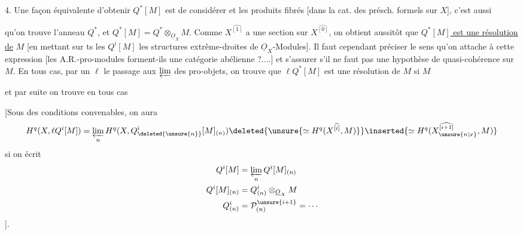 4. Une façon équivalente d'obtenir $Q^*[M]$ est de considérer
et les produits fibrés [dans la cat. des présch. formels sur $X$],  c'est aussi

qu'on trouve l'anneau  $Q^*$, et $Q^*[M]=Q^*\otimes_{\underline O_X}M$. Comme $X^{\widehat{[1]}}$ a une section sur $X^{\widehat{[0]}}$, on obtient aussitôt que \uline{$Q^*[M]$ est une résolution de} $M$ [en mettant sur ts les $Q^i[M]$ les structures extrême-droites de $\underline O_X$-Modules]. Il faut cependant préciser le sens qu'on attache à cette expression [les A.R.-pro-modules forment-ils une catégorie abélienne ?....] et s'assurer s'il ne faut pas une hypothèse de quasi-cohérence sur $M$.
En tous cas,   par un $\ell$ le passage aux $\varprojlim$ des pro-objets, on trouve que $\ell Q^*[M]$ est une résolution de $M$ si $M$ 

et par suite on trouve en tous cas

[Sous des conditions convenables, on aura
\[
H^q(X,\ell Q^i[M])=\varprojlim_n H^q(X,Q^i_{\deleted{\unsure{n}}}[M]_{(n)})
\deleted{\unsure{\simeq H^q(X^{\widehat{[i]}},M)}}
\inserted{\simeq H^q(X_{\unsure{n|x}}^{\widehat{[i+1]}},M)}
\]
si on écrit
\[
\begin{aligned}
Q^i[M]&=\varprojlim_n Q^i[M]_{(n)}\\
Q^i[M]_{(n)}&=Q^i_{(n)}\otimes_{\underline O_X}M\\
Q^i_{(n)}&=\mathcal P^{\unsure{i+1}}_{(n)}=\cdots
\end{aligned}
\]
].

